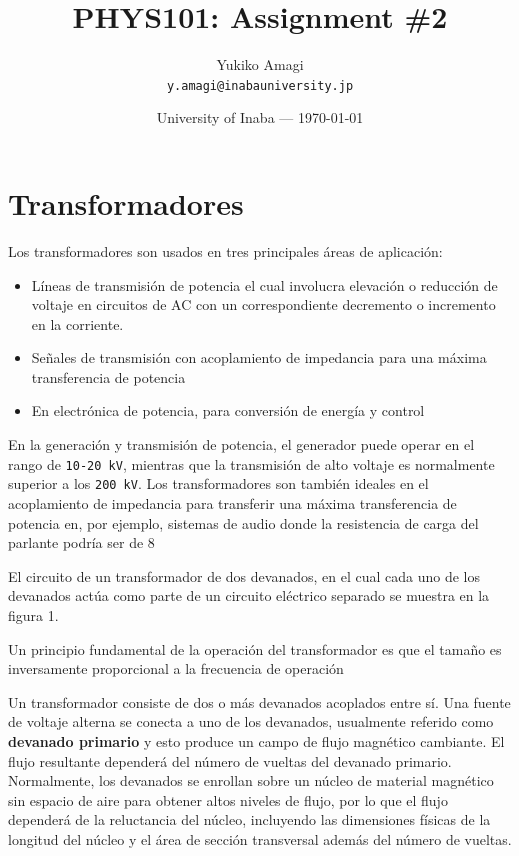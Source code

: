 \documentclass{article}
\title{PHYS101: Assignment \#2} %
\author{Yukiko Amagi\\ \texttt{y.amagi@inabauniversity.jp}} %
\date{University of Inaba --- \today} %
\begin{document}
\maketitle %


\section*{Transformadores} %
Los transformadores son usados en tres principales áreas de aplicación:
\begin{itemize}[noitemsep]
	\item Líneas de transmisión de potencia el cual involucra elevación o reducción de voltaje en circuitos de AC con un correspondiente decremento o incremento en la corriente.
	\item Señales de transmisión con acoplamiento de impedancia para una máxima transferencia de potencia
	\item En electrónica de potencia, para conversión de energía y control
\end{itemize}

\noindent En la generación y transmisión de potencia, el generador puede operar en el rango de \texttt{10-20 kV}, mientras que la transmisión de alto voltaje es normalmente superior a los \texttt{200 kV}.
Los transformadores son también ideales en el acoplamiento de impedancia para transferir una máxima transferencia de potencia en, por ejemplo, sistemas de audio donde la resistencia de carga del parlante podría ser de \qty{8}{\Omega} 

\noindent El circuito de un transformador de dos devanados, en el cual cada uno de los devanados actúa como parte de un circuito eléctrico separado se muestra en la figura 1. 

\begin{info}
		Un principio fundamental de la operación del transformador es que el tamaño es inversamente proporcional a la frecuencia de operación
\end{info}


\noindent Un transformador consiste de dos o más devanados acoplados entre sí. Una fuente de voltaje alterna se conecta a uno de los devanados, usualmente referido como \textbf{devanado primario} y esto produce un campo de flujo magnético cambiante. El flujo resultante dependerá del número de vueltas del devanado primario. Normalmente, los devanados se enrollan sobre un núcleo de material magnético sin espacio de aire para obtener altos niveles de flujo, por lo que el flujo dependerá de la reluctancia del núcleo, incluyendo las dimensiones físicas de la longitud del núcleo y el área de sección transversal además del número de vueltas.
\end{document}
